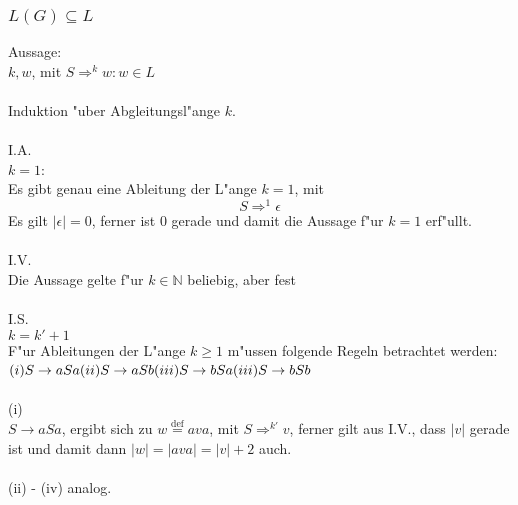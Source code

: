 \documentclass{article}
\newcommand{\gap}{\null\ \\ \\}
\newcommand{\rA}{\rightarrow}
\newcommand{\RA}{\Rightarrow}
\newcommand{\eps}{\epsilon}
\newcommand{\mdef}{\overset{\text{def}}{=}}
\begin{document}
\subsubsection{$L(G) \subseteq L$}
Aussage:\\
$k, w$, mit $S \RA^k w : w \in L$\\
\\
Induktion "uber Abgleitungsl"ange $k$.\\
\\
I.A.\\
$k = 1$:\\
Es gibt genau eine Ableitung der L"ange $k=1$, mit\[
    S \RA^1 \eps
    \]
Es gilt $|\eps| = 0$, ferner ist 0 gerade und damit die Aussage f"ur $k=1$
    erf"ullt.\\
\\
I.V.\\
Die Aussage gelte f"ur $k \in \mathbb{N}$ beliebig, aber fest\\
\\
I.S.\\
$k = k'+1$\\
F"ur Ableitungen der L"ange $k \geq 1$ m"ussen folgende Regeln betrachtet werden:\\
$
    (i) S \rA aSa\\
    (ii) S \rA aSb\\
    (iii) S \rA bSa\\
    (iii) S \rA bSb\\
$\gap
(i)\\
$S \rA aSa $, ergibt sich zu $w \mdef ava$, mit $ S \RA^{k'} v$, ferner gilt 
    aus I.V., dass $|v|$ gerade ist und damit dann $|w| = |ava| = |v| + 2$ 
    auch.\\
\\
(ii) - (iv) analog.\\
\end{document}
